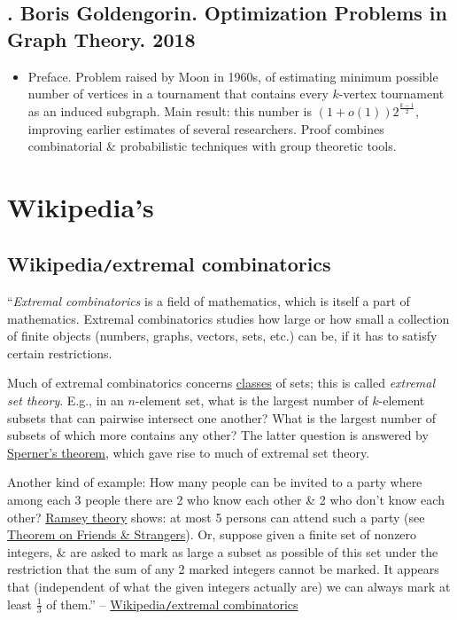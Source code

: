 \documentclass{article}
\begin{document}

\subsection{\cite{Goldengorin2018}. {\sc Boris Goldengorin}. Optimization Problems in Graph Theory. 2018}

\begin{itemize}
    \item {\sf Preface.} Problem raised by Moon in 1960s, of estimating minimum possible number of vertices in a tournament that contains every $k$-vertex tournament as an induced subgraph. Main result: this number is $(1 + o(1))2^{\frac{k-1}{2}}$, improving earlier estimates of several researchers. Proof combines combinatorial \& probabilistic techniques with group theoretic tools.
\end{itemize}


\section{Wikipedia's}

\subsection{Wikipedia{\tt/}extremal combinatorics}
``{\it Extremal combinatorics} is a field of mathematics, which is itself a part of mathematics. Extremal combinatorics studies how large or how small a collection of finite objects (numbers, graphs, vectors, sets, etc.) can be, if it has to satisfy certain restrictions.

Much of extremal combinatorics concerns \href{https://en.wikipedia.org/wiki/Class_(set_theory)}{classes} of sets; this is called {\it extremal set theory}. E.g., in an $n$-element set, what is the largest number of $k$-element subsets that can pairwise intersect one another? What is the largest number of subsets of which more contains any other? The latter question is answered by \href{https://en.wikipedia.org/wiki/Sperner%27s_theorem}{Sperner's theorem}, which gave rise to much of extremal set theory.

Another kind of example: How many people can be invited to a party where among each 3 people there are 2 who know each other \& 2 who don't know each other? \href{https://en.wikipedia.org/wiki/Ramsey_theory}{Ramsey theory} shows: at most 5 persons can attend such a party (see \href{https://en.wikipedia.org/wiki/Theorem_on_Friends_and_Strangers}{Theorem on Friends \& Strangers}). Or, suppose given a finite set of nonzero integers, \& are asked to mark as large a subset as possible of this set under the restriction that the sum of any 2 marked integers cannot be marked. It appears that (independent of what the given integers actually are) we can always mark at least $\frac{1}{3}$ of them.'' -- \href{https://en.wikipedia.org/wiki/Extremal_combinatorics}{Wikipedia{\tt/}extremal combinatorics}
\end{document}
